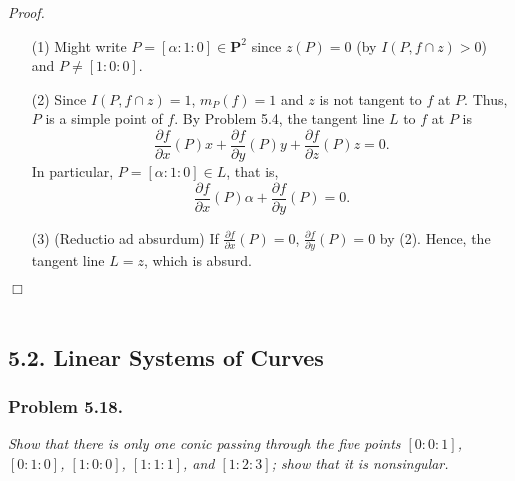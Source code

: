 \documentclass{article}
\begin{document}
\emph{Proof.}
\begin{enumerate}
\item[(1)]
  Might write $P = [\alpha:1:0] \in \mathbf{P}^2$
  since $z(P) = 0$ (by $I(P, f \cap z) > 0$) and $P \neq [1:0:0]$.

\item[(2)]
  Since $I(P, f \cap z) = 1$, $m_P(f) = 1$ and $z$ is not tangent to $f$ at $P$.
  Thus, $P$ is a simple point of $f$.
  By Problem 5.4, the tangent line $L$ to $f$ at $P$ is
  \[
    \frac{\partial f}{\partial x}(P) x +
    \frac{\partial f}{\partial y}(P) y +
    \frac{\partial f}{\partial z}(P) z = 0.
  \]
  In particular, $P = [\alpha:1:0] \in L$, that is,
  \[
    \frac{\partial f}{\partial x}(P) \alpha +
    \frac{\partial f}{\partial y}(P) = 0.
  \]

\item[(3)]
  (Reductio ad absurdum)
  If $\frac{\partial f}{\partial x}(P) = 0$, $\frac{\partial f}{\partial y}(P) = 0$ by (2).
  Hence, the tangent line $L = z$, which is absurd.
\end{enumerate}
$\Box$ \\\\






\subsection*{5.2. Linear Systems of Curves \\}






\subsubsection*{Problem 5.18.}
\emph{Show that there is only one conic passing through the five points
$[0:0:1]$, $[0:1:0]$, $[1:0:0]$, $[1:1:1]$, and $[1:2:3]$;
show that it is nonsingular.} \\
\end{document}
